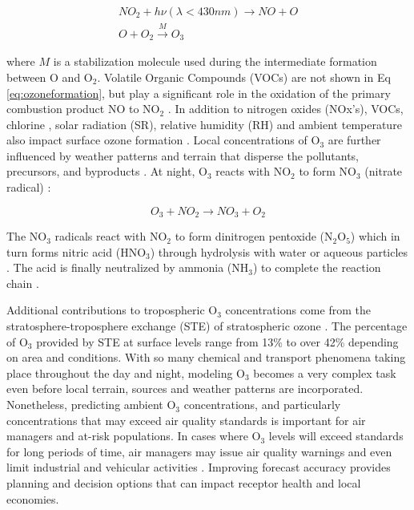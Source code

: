 \begin{equation}
\label{eq:ozoneformation}
\begin{gathered}
NO_{2}+h\nu (\lambda < 430nm) \rightarrow NO+O \\
O+O_{2}\overset{M}{\rightarrow} O_{3}
\end{gathered}
\end{equation}

\noindent
where $M$ is a stabilization molecule used during the intermediate formation between O and O$_{2}$. Volatile Organic Compounds (VOCs) are not shown in Eq \ref{eq:ozoneformation}, but play a significant role in the oxidation of the primary combustion product NO to NO$_{2}$ \citep{Song2011}. In addition to nitrogen oxides (NOx's), VOCs, chlorine \citep{Thornton2010}, solar radiation (SR), relative humidity (RH) and ambient temperature also impact surface ozone formation \citep{Sadanaga2003}.  Local concentrations of O$_{3}$ are further influenced by weather patterns and terrain that disperse the pollutants, precursors, and byproducts \citep{Beck1998}. At night, O$_{3}$ reacts with NO$_{2}$ to form NO$_{3}$ (nitrate radical) \citep{Finlayson1993}:

\begin{equation}
\label{eq:nitrateformation}
O_{3} + NO_{2}\rightarrow NO_{3}+O_{2} 
\end{equation}

The NO$_{3}$ radicals react with NO$_{2}$ to form dinitrogen pentoxide (N$_{2}$O$_{5}$) which in turn forms nitric acid (HNO$_{3}$) through hydrolysis with water or aqueous particles \citep{Song2011}. The acid is finally neutralized by ammonia (NH$_{3}$) to complete the reaction chain \citep{Brown2012}.

Additional contributions to tropospheric O$_{3}$ concentrations come from the stratosphere-troposphere exchange (STE) of stratospheric ozone \citep{Tarasick2008}. The percentage of O$_{3}$ provided by STE at surface levels range from 13\% \citep{Cooper2006} to over 42\% \citep{Lelieveld2000} depending on area and conditions. With so many chemical and transport phenomena taking place throughout the day and night, modeling O$_{3}$ becomes a very complex task even before local terrain, sources and weather patterns are incorporated. Nonetheless, predicting ambient O$_{3}$ concentrations, and particularly concentrations that may exceed air quality standards is important for air managers and at-risk populations.  In cases where O$_{3}$ levels will exceed standards for long periods of time, air managers may issue air quality warnings and even limit industrial and vehicular activities \citep{Kuhlbusch2014, Welch2005}. Improving forecast accuracy provides planning and decision options that can impact receptor health and local economies.

